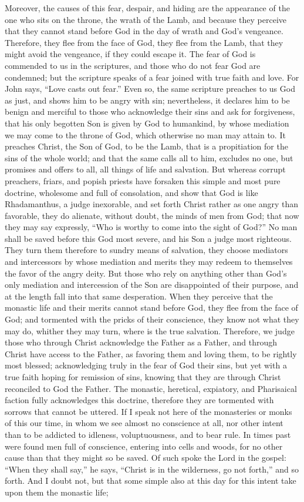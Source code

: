 Moreover, the causes of this fear, despair, and hiding are the appearance of the one who sits on the throne, the wrath of the Lamb, and because they perceive that they cannot stand before God in the day of wrath and God’s vengeance. Therefore, they flee from the face of God, they flee from the Lamb, that they might avoid the vengeance, if they could escape it. The fear of God is commended to us in the scriptures, and those who do not fear God are condemned; but the scripture speaks of a fear joined with true faith and love. For John says, “Love casts out fear.” Even so, the same scripture preaches to us God as just, and shows him to be angry with sin; nevertheless, it declares him to be benign and merciful to those who acknowledge their sins and ask for forgiveness, that his only begotten Son is given by God to humankind, by whose mediation we may come to the throne of God, which otherwise no man may attain to. It preaches Christ, the Son of God, to be the Lamb, that is a propitiation for the sins of the whole world; and that the same calls all to him, excludes no one, but promises and offers to all, all things of life and salvation. But whereas corrupt preachers, friars, and popish priests have forsaken this simple and most pure doctrine, wholesome and full of consolation, and show that God is like Rhadamanthus, a judge inexorable, and set forth Christ rather as one angry than favorable, they do alienate, without doubt, the minds of men from God; that now they may say expressly, “Who is worthy to come into the sight of God?” No man shall be saved before this God most severe, and his Son a judge most righteous. They turn them therefore to sundry means of salvation, they choose mediators and intercessors by whose mediation and merits they may redeem to themselves the favor of the angry deity. But those who rely on anything other than God’s only mediation and intercession of the Son are disappointed of their purpose, and at the length fall into that same desperation. When they perceive that the monastic life and their merits cannot stand before God, they flee from the face of God; and tormented with the pricks of their conscience, they know not what they may do, whither they may turn, where is the true salvation. Therefore, we judge those who through Christ acknowledge the Father as a Father, and through Christ have access to the Father, as favoring them and loving them, to be rightly most blessed; acknowledging truly in the fear of God their sins, but yet with a true faith hoping for remission of sins, knowing that they are through Christ reconciled to God the Father. The monastic, heretical, expiatory, and Pharisaical faction fully acknowledges this doctrine, therefore they are tormented with sorrows that cannot be uttered. If I speak not here of the monasteries or monks of this our time, in whom we see almost no conscience at all, nor other intent than to be addicted to idleness, voluptuousness, and to bear rule. In times past were found men full of conscience, entering into cells and woods, for no other cause than that they might so be saved. Of such spoke the Lord in the gospel: “When they shall say,” he says, “Christ is in the wilderness, go not forth,” and so forth. And I doubt not, but that some simple also at this day for this intent take upon them the monastic life; 